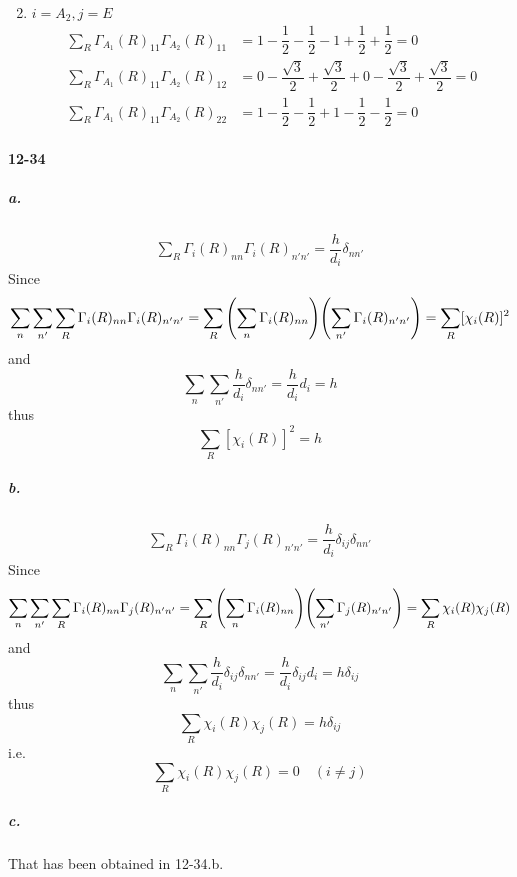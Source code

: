 \documentclass[a4paper]{article}
\newcommand{\ex}[1]{\paragraph{12-#1}}
\newcommand{\subex}[1]{\subparagraph{#1}}
\numberwithin{equation}{section}
\begin{document}
\begin{enumerate}
\begin{align}
	\end{align}
	\item $ i=A_2, j=E $
	\begin{align}\label{key}
	\sum_R \Gamma_{A_1}(R)_{11}\Gamma_{A_2}(R)_{11} &= 1  - \dfrac{1}{2} - \dfrac{1}{2} - 1 + \dfrac{1}{2} + \dfrac{1}{2} = 0\\
	\sum_R \Gamma_{A_1}(R)_{11}\Gamma_{A_2}(R)_{12} &= 0 -\dfrac{\sqrt{3}}{2} + \dfrac{\sqrt{3}}{2} + 0 - \dfrac{\sqrt{3}}{2} + \dfrac{\sqrt{3}}{2} = 0\\
	\sum_R \Gamma_{A_1}(R)_{11}\Gamma_{A_2}(R)_{22} &= 1 -\dfrac{1}{2} -\dfrac{1}{2} + 1 - \dfrac{1}{2} - \dfrac{1}{2} = 0
	\end{align}
	
\end{enumerate}

\ex{34}
\subex{a.}
\begin{align}
\sum_R \Gamma_i(R)_{nn}\Gamma_i(R)_{n'n'} = \dfrac{h}{d_i}\delta_{nn'}
\end{align}
Since
\begin{align}
\sum_n\sum_{n'}\sum_R \Gamma_i(R)_{nn}\Gamma_i(R)_{n'n'} = \sum_R \qty(\sum_n\Gamma_i(R)_{nn}) \qty(\sum_{n'}\Gamma_i(R)_{n'n'}) = \sum_R [\chi_i(R)]^2
\end{align}
and
\begin{equation}\label{key}
\sum_n\sum_{n'} \dfrac{h}{d_i}\delta_{nn'} = \dfrac{h}{d_i}d_i = h
\end{equation}
thus
\begin{equation}\label{key}
\sum_R [\chi_i(R)]^2 = h
\end{equation}
\subex{b.}
\begin{align}
\sum_R \Gamma_i(R)_{nn}\Gamma_j(R)_{n'n'} = \dfrac{h}{d_i}\delta_{ij}\delta_{nn'}
\end{align}
Since
\begin{align}
\sum_n\sum_{n'}\sum_R \Gamma_i(R)_{nn}\Gamma_j(R)_{n'n'} = \sum_R \qty(\sum_n\Gamma_i(R)_{nn}) \qty(\sum_{n'}\Gamma_j(R)_{n'n'}) = \sum_R \chi_i(R) \chi_j(R)
\end{align}
and
\begin{equation}\label{key}
\sum_n\sum_{n'} \dfrac{h}{d_i}\delta_{ij}\delta_{nn'} = \dfrac{h}{d_i}\delta_{ij}d_i = h\delta_{ij}
\end{equation}
thus
\begin{equation}\label{key}
\sum_R \chi_i(R) \chi_j(R) = h\delta_{ij}
\end{equation}
i.e.
\begin{equation}\label{key}
\sum_R \chi_i(R) \chi_j(R) = 0 \quad (i\neq j)
\end{equation}
\subex{c.}
That has been obtained in 12-34.b.
\end{document}
